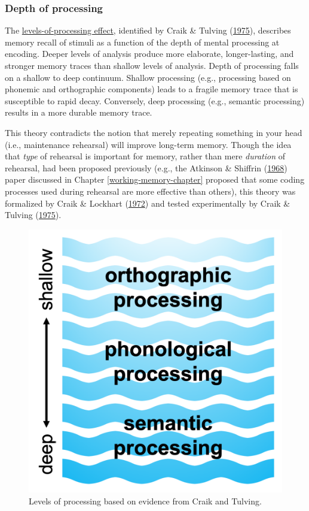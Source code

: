 \documentclass[
]{krantz}
\begin{document}
\hypertarget{depth-of-processing}{%
\subsubsection*{Depth of processing}\label{depth-of-processing}}


The \protect\hyperlink{levels-of-processing-effect}{levels-of-processing effect}, identified by Craik \& Tulving (\protect\hyperlink{ref-Craik1975}{1975}), describes memory recall of stimuli as a function of the depth of mental processing at encoding. Deeper levels of analysis produce more elaborate, longer-lasting, and stronger memory traces than shallow levels of analysis. Depth of processing falls on a shallow to deep continuum. Shallow processing (e.g., processing based on phonemic and orthographic components) leads to a fragile memory trace that is susceptible to rapid decay. Conversely, deep processing (e.g., semantic processing) results in a more durable memory trace.

This theory contradicts the notion that merely repeating something in your head (i.e., maintenance rehearsal) will improve long-term memory. Though the idea that \emph{type} of rehearsal is important for memory, rather than mere \emph{duration} of rehearsal, had been proposed previously (e.g., the Atkinson \& Shiffrin (\protect\hyperlink{ref-atkinson1968human}{1968}) paper discussed in Chapter \ref{working-memory-chapter} proposed that some coding processes used during rehearsal are more effective than others), this theory was formalized by Craik \& Lockhart (\protect\hyperlink{ref-craik1972levels}{1972}) and tested experimentally by Craik \& Tulving (\protect\hyperlink{ref-Craik1975}{1975}).

\begin{figure}

{\centering \includegraphics[width=0.35\linewidth]{images/ch5/fig4} 

}

\caption{Levels of processing based on evidence from Craik and Tulving.}\label{fig:lop}
\end{figure}
\end{document}
